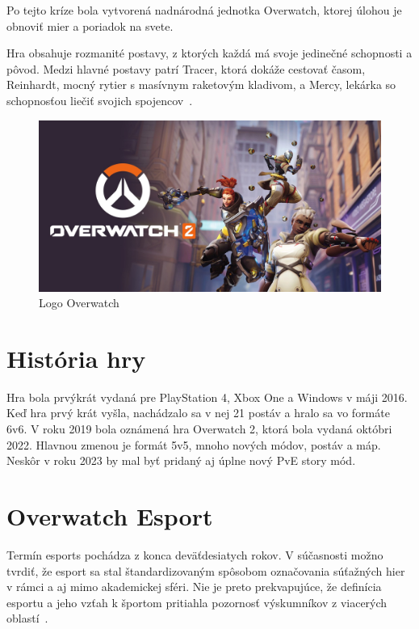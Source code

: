 \documentclass[10pt,oneside,slovak,a4paper]{article}
\begin{document}
Po tejto kríze bola vytvorená nadnárodná jednotka Overwatch, ktorej úlohou je obnoviť mier a poriadok na svete.

Hra obsahuje rozmanité postavy, z ktorých každá má svoje jedinečné schopnosti a pôvod. Medzi hlavné postavy patrí Tracer, ktorá dokáže cestovať časom, Reinhardt, mocný rytier s masívnym raketovým kladivom, a Mercy, lekárka so schopnosťou liečiť svojich spojencov~\cite{Overwatchanalysis}. 

\begin{figure}[h!]
\includegraphics[scale=0.2]{images/overwatch_title_image.jpg}
\caption{Logo Overwatch}
\end{figure}

\newpage
\section{História hry} \label{História hry}

Hra bola prvýkrát vydaná pre PlayStation 4, Xbox One a Windows v máji 2016. Keď hra prvý krát vyšla, nachádzalo sa v nej 21 postáv a hralo sa vo formáte 6v6. V roku 2019 bola oznámená hra Overwatch 2, ktorá bola vydaná októbri 2022. Hlavnou zmenou je formát 5v5, mnoho nových módov, postáv a máp. Neskôr v roku 2023 by mal byť pridaný aj úplne nový PvE story mód.


\section{Overwatch Esport} \label{Overwatch Esport}

Termín esports pochádza z konca deväťdesiatych rokov. V súčasnosti možno tvrdiť, že esport sa stal štandardizovaným spôsobom označovania súťažných hier v rámci a aj mimo akademickej sféri. Nie je preto prekvapujúce, že definícia esportu a jeho vzťah k športom pritiahla pozornosť výskumníkov z viacerých oblastí~\cite{Overwatchesport}.
\end{document}
